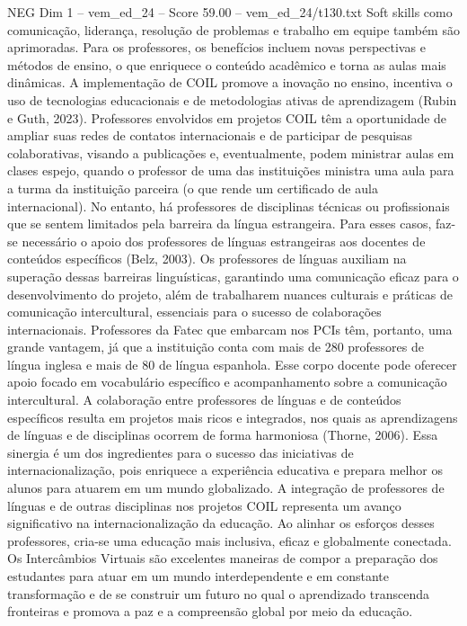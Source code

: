 \begin{textsample}{NEG Dim 1 – vem\_ed\_24 – Score 59.00 – vem\_ed\_24/t130.txt}
Soft skills como comunicação, liderança, resolução de problemas e trabalho em equipe também são aprimoradas.
Para os professores, os benefícios incluem novas perspectivas e métodos de ensino, o que enriquece o conteúdo acadêmico e torna as aulas mais dinâmicas.
A implementação de COIL promove a inovação no ensino, incentiva o uso de tecnologias educacionais e de metodologias ativas de aprendizagem (Rubin e Guth, 2023).
Professores envolvidos em projetos COIL têm a oportunidade de ampliar suas redes de contatos internacionais e de participar de pesquisas colaborativas, visando a publicações e, eventualmente, podem ministrar aulas em clases espejo, quando o professor de uma das instituições ministra uma aula para a turma da instituição parceira (o que rende um certificado de aula internacional).
No entanto, há professores de disciplinas técnicas ou profissionais que se sentem limitados pela barreira da língua estrangeira.
Para esses casos, faz-se necessário o apoio dos professores de línguas estrangeiras aos docentes de conteúdos específicos (Belz, 2003).
Os professores de línguas auxiliam na superação dessas barreiras linguísticas, garantindo uma comunicação eficaz para o desenvolvimento do projeto, além de trabalharem nuances culturais e práticas de comunicação intercultural, essenciais para o sucesso de colaborações internacionais.
Professores da Fatec que embarcam nos PCIs têm, portanto, uma grande vantagem, já que a instituição conta com mais de 280 professores de língua inglesa e mais de 80 de língua espanhola.
Esse corpo docente pode oferecer apoio focado em vocabulário específico e acompanhamento sobre a comunicação intercultural.
A colaboração entre professores de línguas e de conteúdos específicos resulta em projetos mais ricos e integrados, nos quais as aprendizagens de línguas e de disciplinas ocorrem de forma harmoniosa (Thorne, 2006).
Essa sinergia é um dos ingredientes para o sucesso das iniciativas de internacionalização, pois enriquece a experiência educativa e prepara melhor os alunos para atuarem em um mundo globalizado.
A integração de professores de línguas e de outras disciplinas nos projetos COIL representa um avanço significativo na internacionalização da educação.
Ao alinhar os esforços desses professores, cria-se uma educação mais inclusiva, eficaz e globalmente conectada.
Os Intercâmbios Virtuais são excelentes maneiras de compor a preparação dos estudantes para atuar em um mundo interdependente e em constante transformação e de se construir um futuro no qual o aprendizado transcenda fronteiras e promova a paz e a compreensão global por meio da educação.

\end{textsample}
